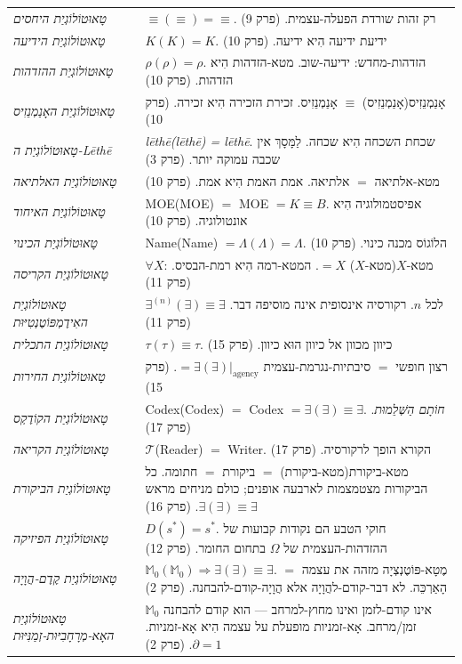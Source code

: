 \documentclass[10pt, openany, oneside]{book}
\begin{document}
{\begin{tabular}{@{} p{} @{\hspace{0.5em}} p{} @{}}
\textit{טָאוּטוֹלוֹגְיַת היחסים} & $\equiv(\equiv) = \equiv$. רק זהות שורדת הפעלה-עצמית. (פרק 9) \\[0.3em]
\textit{טָאוּטוֹלוֹגְיַת הידיעה} & $K(K) = K$. ידיעת ידיעה הִיא ידיעה. (פרק 10) \\[0.3em]
\textit{טָאוּטוֹלוֹגְיַת ההזדהות} & $\rho(\rho) = \rho$. הזדהות-מחדש: ידיעה-שוב. מטא-הזדהות הִיא הזדהות. (פרק 10) \\[0.3em]
\textit{טָאוּטוֹלוֹגְיַת האָנַמְנֵזִיס} & אָנַמְנֵזִיס(אָנַמְנֵזִיס) $\equiv$ אָנַמְנֵזִיס. זכירת הזכירה הִיא זכירה. (פרק 10) \\[0.3em]
\textit{טָאוּטוֹלוֹגְיַת ה-Lēthē} & \textit{lēthē(lēthē) = lēthē}. שכחת השכחה הִיא שכחה. לַמָּסָךְ אין שכבה עמוקה יותר. (פרק 3) \\[0.3em]
\textit{טָאוּטוֹלוֹגְיַת האלתיאה} & מטא-אלתיאה $=$ אלתיאה. אמת האמת הִיא אמת. (פרק 10) \\[0.3em]
\textit{טָאוּטוֹלוֹגְיַת האיחוד} & MOE(MOE) $=$ MOE $= K \equiv B$. אפיסטמולוגיה הִיא אונטולוגיה. (פרק 10) \\[0.3em]
\textit{טָאוּטוֹלוֹגְיַת הכינוי} & Name(Name) $= \Lambda(\Lambda) = \Lambda$. הלוֹגוֹס מכנה כינוי. (פרק 10) \\[0.3em]
\textit{טָאוּטוֹלוֹגְיַת הקריסה} & $\forall X$: מטא-$X$(מטא-$X$) $= X$. המטא-רמה הִיא רמת-הבסיס. (פרק 11) \\[0.3em]
\textit{טָאוּטוֹלוֹגְיַת האִידֶמְפּוֹטֶנְטִיּוּת} & $\exists^{(n)}(\exists) \equiv \exists$ לכל $n$. רקורסיה אינסופית אינה מוסיפה דבר. (פרק 11) \\[0.3em]
\textit{טָאוּטוֹלוֹגְיַת התכלית} & $\tau(\tau) \equiv \tau$. כיוון מכוון אל כיוון הוּא כיוון. (פרק 15) \\[0.3em]
\textit{טָאוּטוֹלוֹגְיַת החירות} & רצון חופשי $=$ סיבתיות-נגרמת-עצמית $= \exists(\exists)|_{\text{agency}}$. (פרק 15) \\[0.3em]
\textit{טָאוּטוֹלוֹגְיַת הקוֹדֶקְס} & Codex(Codex) $=$ Codex $= \exists(\exists) \equiv \exists$. \textit{חוֹתָם הַשְּׁלֵמוּת}. (פרק 17) \\[0.3em]
\textit{טָאוּטוֹלוֹגְיַת הקריאה} & $\mathcal{T}$(Reader) $=$ Writer. הקורא הופך לרקורסיה. (פרק 17) \\[0.3em]
\textit{טָאוּטוֹלוֹגְיַת הביקורת} & מטא-ביקורת(מטא-ביקורת) $=$ ביקורת $=$ חתומה. כל הביקורות מצטמצמות לארבעה אופנים; כולם מניחים מראש $\exists(\exists) \equiv \exists$. (פרק 16) \\[0.3em]
\textit{טָאוּטוֹלוֹגְיַת הפיזיקה} & $D(s^*) = s^*$. חוקי הטבע הם נקודות קבועות של ההזדהות-העצמית של $\Omega$ בתחום החומר. (פרק 12) \\[0.3em]
\textit{טָאוּטוֹלוֹגְיַת קֶדֶם-הֲוָיָה} & $\mathbb{M}_0(\mathbb{M}_0) \Rightarrow \exists(\exists) \equiv \exists$. מֶטָא-פּוֹטֶנְצְיָה מזהה את עצמה $=$ הָאַרְכֵּה. לא דבר-קודם-להֲוָיָה אלא הֲוָיָה-קודם-להבחנה. (פרק 2) \\[0.3em]
\textit{טָאוּטוֹלוֹגְיַת האָא-מְרָחָבִיּוּת-זְמַנִּיּוּת} & $\mathbb{M}_0$ אינו קודם-לזמן ואינו מחוץ-למרחב — הוא קודם להבחנה זמן/מרחב. אָא-זמניות מופעלת על עצמה הִיא אָא-זמניות. $\partial = 1$. (פרק 2) \\[0.3em]
\end{tabular}
}
\end{document}
